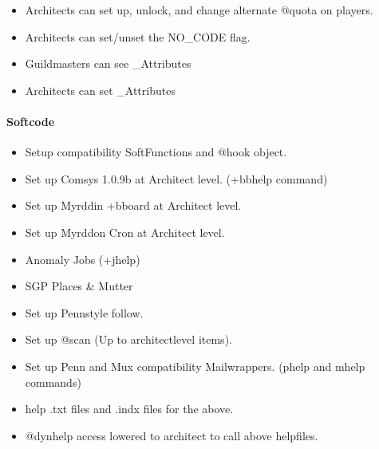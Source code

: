 \documentclass[letterpaper,10pt,english]{sphinxmanual}
\begin{document}
\begin{itemize}
\item {} 
\sphinxAtStartPar
Architects can set up, unlock, and change alternate @quota on players.

\item {} 
\sphinxAtStartPar
Architects can set/unset the NO\_CODE flag.

\item {} 
\sphinxAtStartPar
Guildmasters can see \_Attributes

\item {} 
\sphinxAtStartPar
Architects can set \_Attributes

\end{itemize}


\paragraph{Softcode}
\label{\detokenize{gettingstarted:softcode}}\begin{itemize}
\item {} 
\sphinxAtStartPar
Set\sphinxhyphen{}up compatibility SoftFunctions and @hook object.

\item {} 
\sphinxAtStartPar
Set up Comsys 1.0.9b at Architect level. (+bbhelp command)

\item {} 
\sphinxAtStartPar
Set up Myrddin +bboard at Architect level.

\item {} 
\sphinxAtStartPar
Set up Myrddon Cron at Architect level.

\item {} 
\sphinxAtStartPar
Anomaly Jobs (+jhelp)

\item {} 
\sphinxAtStartPar
SGP Places \& Mutter

\item {} 
\sphinxAtStartPar
Set up Penn\sphinxhyphen{}style follow.

\item {} 
\sphinxAtStartPar
Set up @scan (Up to architect\sphinxhyphen{}level items).

\item {} 
\sphinxAtStartPar
Set up Penn\sphinxhyphen{} and Mux compatibility Mailwrappers. (phelp and mhelp commands)

\item {} 
\sphinxAtStartPar
help .txt files and .indx files for the above.

\item {} 
\sphinxAtStartPar
@dynhelp access lowered to architect to call above helpfiles.

\end{itemize}
\end{document}
